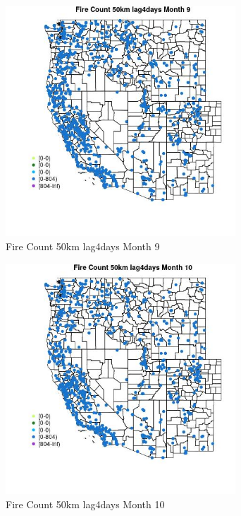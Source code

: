 \begin{figure} 
\centering  
\includegraphics[width=0.77\textwidth]{Code_Outputs/Report_ML_input_PM25_Step4_part_f_de_duplicated_aveswNAs_MapObsMo9Fire_Count_50km_lag4days.jpg} 
\caption{\label{fig:Report_ML_input_PM25_Step4_part_f_de_duplicated_aveswNAsMapObsMo9Fire_Count_50km_lag4days}Fire Count 50km lag4days Month 9} 
\end{figure} 
 

\begin{figure} 
\centering  
\includegraphics[width=0.77\textwidth]{Code_Outputs/Report_ML_input_PM25_Step4_part_f_de_duplicated_aveswNAs_MapObsMo10Fire_Count_50km_lag4days.jpg} 
\caption{\label{fig:Report_ML_input_PM25_Step4_part_f_de_duplicated_aveswNAsMapObsMo10Fire_Count_50km_lag4days}Fire Count 50km lag4days Month 10} 
\end{figure} 
 

